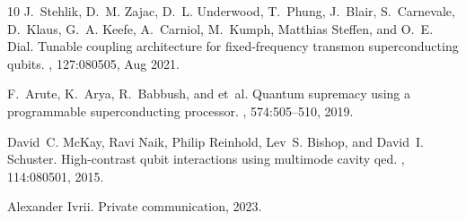 \documentclass{article}
\begin{document}
\begin{thebibliography}{10}
	J.~Stehlik, D.~M. Zajac, D.~L. Underwood, T.~Phung, J.~Blair, S.~Carnevale,
	D.~Klaus, G.~A. Keefe, A.~Carniol, M.~Kumph, Matthias Steffen, and O.~E.
	Dial.
	\newblock Tunable coupling architecture for fixed-frequency transmon
	superconducting qubits.
	, 127:080505, Aug 2021.
	
	F.~Arute, K.~Arya, R.~Babbush, and et~al.
	\newblock Quantum supremacy using a programmable superconducting processor.
	, 574:505--510, 2019.
	
	David~C. McKay, Ravi Naik, Philip Reinhold, Lev~S. Bishop, and David~I.
	Schuster.
	\newblock High-contrast qubit interactions using multimode cavity qed.
	, 114:080501, 2015.
	
	Alexander Ivrii.
	\newblock Private communication, 2023.
	
\end{thebibliography}
\end{document}
